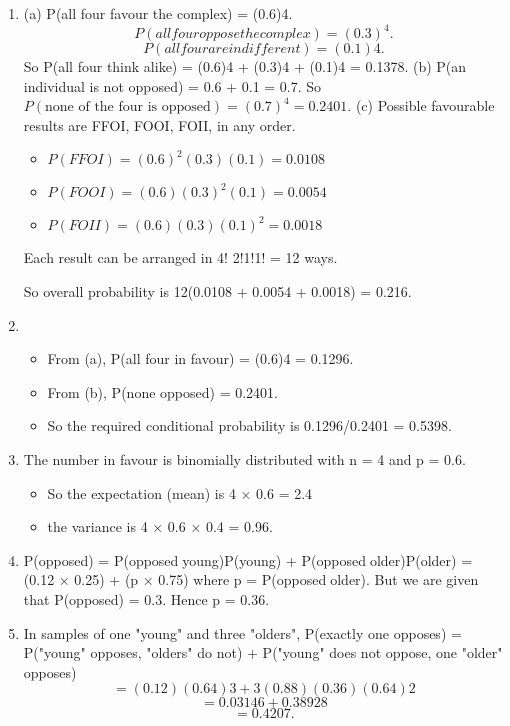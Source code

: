 \documentclass[a4paper,12pt]{article}
\begin{document}
\begin{enumerate}

\item (a) P(all four favour the complex) = (0.6)4.
\[P(all four oppose the complex) = (0.3)^4.\]
\[P(all four are indifferent) = (0.1)4.\]
So P(all four think alike) = (0.6)4 + (0.3)4 + (0.1)4 = 0.1378.
(b) P(an individual is not opposed) = 0.6 + 0.1 = 0.7.
So $P(\mbox{none of the four is opposed}) = (0.7)^4 = 0.2401$.
(c) Possible favourable results are FFOI, FOOI, FOII, in any order.
\begin{itemize}
\item $P(FFOI) = (0.6)^2(0.3)(0.1) = 0.0108$
\item $P(FOOI) = (0.6)(0.3)^2(0.1) = 0.0054$
\item $P(FOII) = (0.6)(0.3)(0.1)^2 = 0.0018$
\end{itemize}

Each result can be arranged in 4!
2!1!1!
= 12 ways.

So overall probability is 12(0.0108 + 0.0054 + 0.0018) = 0.216.
\item \begin{itemize}
    \item From (a), P(all four in favour) = (0.6)4 = 0.1296.
    \item From (b), P(none
opposed) = 0.2401. 
\item So the required conditional probability is
0.1296/0.2401 = 0.5398.
\end{itemize} 
\item The number in favour is binomially distributed with n = 4 and p = 0.6. 
\begin{itemize}
    \item So the
expectation (mean) is 4 × 0.6 = 2.4 
\item the variance is 4 × 0.6 × 0.4 = 0.96.
\end{itemize}
\item P(opposed) = P(opposedyoung)P(young) + P(opposedolder)P(older)
= (0.12 × 0.25) + (p × 0.75)
where p = P(opposedolder). But we are given that P(opposed) = 0.3. Hence
p = 0.36.
\item In samples of one "young" and three "olders",
P(exactly one opposes) = P("young" opposes, "olders" do not)
+ P("young" does not oppose, one "older" opposes)
\[= {(0.12)(0.64)3} + {3(0.88)(0.36)(0.64)2}\] \[= 0.03146 + 0.38928\] \[= 0.4207.\]
\end{enumerate}
\end{document}
